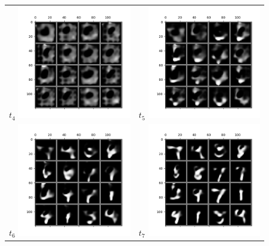 \documentclass{scrartcl}
\begin{document}
\begin{table}
\begin{tabular}{cc}
$t_4$ \includegraphics[width=140pt]{new_4.png} & $t_5$ \includegraphics[width=140pt]{new_5.png}\\
$t_6$ \includegraphics[width=140pt]{new_6.png} & $t_7$ \includegraphics[width=140pt]{new_7.png}\\

\end{tabular}
\end{table}
\end{document}
